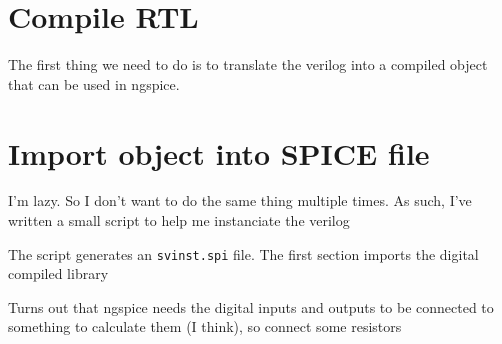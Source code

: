 \section{Compile RTL}\label{compile-rtl}

The first thing we need to do is to translate the verilog into a
compiled object that can be used in ngspice.

\begin{Shaded}
\begin{Highlighting}[]
\end{Highlighting}
\end{Shaded}

\section{Import object into SPICE
file}\label{import-object-into-spice-file}

I'm lazy. So I don't want to do the same thing multiple times. As such,
I've written a small script to help me instanciate the verilog

\begin{Shaded}
\begin{Highlighting}[]
\end{Highlighting}
\end{Shaded}

The script generates an \texttt{svinst.spi} file. The first section
imports the digital compiled library

\begin{Shaded}
\begin{Highlighting}[]
\NormalTok{ [clk}
\ExtensionTok{+}
\ExtensionTok{+}\NormalTok{ ]}
\ExtensionTok{+}\NormalTok{ [b.4}
\ExtensionTok{+}
\ExtensionTok{+}
\ExtensionTok{+}
\ExtensionTok{+}
\ExtensionTok{+}\NormalTok{ ] null dut}
\ExtensionTok{+}
\end{Highlighting}
\end{Shaded}

Turns out that ngspice needs the digital inputs and outputs to be
connected to something to calculate them (I think), so connect some
resistors

